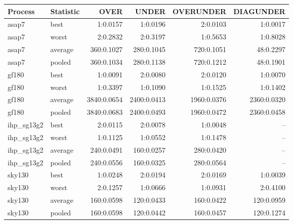 \small
\begin{tabular}{llrrrr}\toprule
Process & Statistic & OVER & UNDER & OVERUNDER & DIAGUNDER \\\midrule
asap7 & best & 1:0.0157 & 1:0.0196 & 2:0.0103 & 1:0.0017 \\
asap7 & worst & 2:0.2832 & 2:0.3197 & 1:0.5653 & 1:0.8028 \\
asap7 & average & 360:0.1027 & 280:0.1045 & 720:0.1051 & 48:0.2297 \\
asap7 & pooled & 360:0.1034 & 280:0.1138 & 720:0.1212 & 48:0.1901 \\
\addlinespace
gf180 & best & 1:0.0091 & 2:0.0080 & 2:0.0120 & 1:0.0070 \\
gf180 & worst & 1:0.3397 & 1:0.1090 & 1:0.1525 & 1:0.1402 \\
gf180 & average & 3840:0.0654 & 2400:0.0413 & 1960:0.0376 & 2360:0.0320 \\
gf180 & pooled & 3840:0.0683 & 2400:0.0493 & 1960:0.0472 & 2360:0.0458 \\
\addlinespace
ihp\_sg13g2 & best & 2:0.0115 & 2:0.0078 & 1:0.0048 & -- \\
ihp\_sg13g2 & worst & 1:0.1125 & 1:0.0552 & 1:0.1478 & -- \\
ihp\_sg13g2 & average & 240:0.0491 & 160:0.0257 & 280:0.0420 & -- \\
ihp\_sg13g2 & pooled & 240:0.0556 & 160:0.0325 & 280:0.0564 & -- \\
\addlinespace
sky130 & best & 1:0.0248 & 2:0.0194 & 2:0.0169 & 1:0.0039 \\
sky130 & worst & 2:0.1257 & 1:0.0666 & 1:0.0931 & 2:0.4100 \\
sky130 & average & 160:0.0598 & 120:0.0433 & 160:0.0422 & 120:0.0959 \\
sky130 & pooled & 160:0.0598 & 120:0.0442 & 160:0.0457 & 120:0.1274 \\
\bottomrule\end{tabular}
